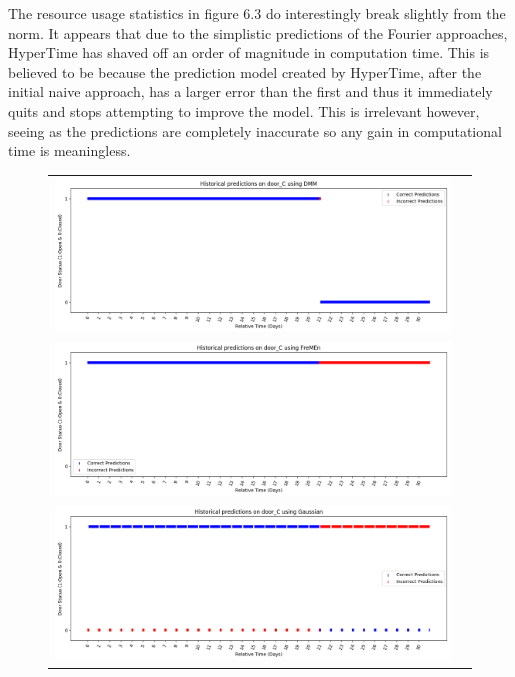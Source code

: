 The resource usage statistics in figure 6.3 do interestingly break slightly
from the norm. It appears that due to the simplistic predictions of the
Fourier approaches, HyperTime has shaved off an order of magnitude in
computation time. This is believed to be because the prediction model created
by HyperTime, after the initial naive approach, has a larger error than the first and thus it immediately quits
and stops attempting to improve the model. This is irrelevant however, seeing
as the predictions are completely inaccurate so any gain in computational time
is meaningless.

\begin{center}
\begin{figure}[!Hp]
  \begin{tabular}{cc}
    {\includegraphics[width = 6in]{images/results/Historical_door_C_DMM.png}} \\
    {\includegraphics[width = 6in]{images/results/Historical_door_C_FreMEn.png}} \\
    {\includegraphics[width = 6in]{images/results/Historical_door_C_Gaussian.png}} \\

\end{tabular}
\end{figure}
\end{center}
